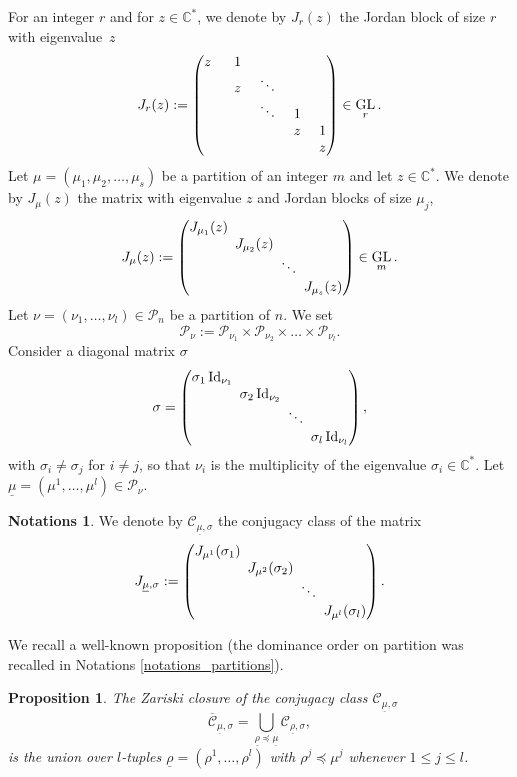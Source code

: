 \documentclass[JEP,XML,SOM,NoEqCountersInSection,Unicode,published]{cedram}
\theoremstyle{definition}
\newtheorem{notations}[definition]{Notations}
\theoremstyle{plain}
\newtheorem{proposition}[definition]{Proposition}
\DeclareMathOperator{\Id}{Id}
\DeclareMathOperator{\GL}{GL}
\newcommand{\C}{\mathbb{C}}
\newcommand{\Part}{\mathcal{P}}
\begin{document}
For an integer $r$ and for $ z \in \C^*$, we denote by $J_r (z)$ the Jordan block of size $r$ with eigenvalue~$z$
\[\arraycolsep6.5pt
J_{r}(z):= \begin{pmatrix}
z \ & 1 & & & \\
& z & \ddots & &\\
& & \ddots & 1 & \\
& & & z & 1 \\
& & & & z
\end{pmatrix} \in \GL_{r}.
\]
Let $\mu=(\mu_1,\mu_2,\dots,\mu_s)$ be a partition of an integer $m$ and let $z \in \C^*$. We denote by $J_{\mu} (z)$ the matrix with eigenvalue $z$ and Jordan blocks of size $\mu_j$,
\[\arraycolsep2.5pt
J_{\mu} (z) :=
\begin{pmatrix}
J_{\mu_1}(z) & & &\\
& J_{\mu_2}(z) & & \\
& & \ddots & \\
& & & J_{\mu_s}(z)
\end{pmatrix} \in \GL_{m}.
\]
Let $\nu=(\nu_1,\dots,\nu_l) \in \Part_n$ be a partition of $n$. We set
\[
\Part_{\nu} := \Part_{\nu_1}\times\Part_{\nu_2} \times\dots\times \Part_{\nu_l}.
\]
Consider a diagonal matrix $\sigma$
\begin{equation}\label{eq_def_sigma}
\arraycolsep2.5pt
\sigma = \begin{pmatrix}
\sigma_1 \Id_{\nu_1} & & & \\
& \sigma_2 \Id_{\nu_2} & & \\
& & \ddots & \\
& & & \sigma_l \Id_{\nu_l}
\end{pmatrix},
\end{equation}
with $\sigma_i \ne \sigma_j$ for $i\ne j$, so that $\nu_i$ is the multiplicity of the eigenvalue $\sigma_i\in \C^*$. Let $\underline{\mu}= \left(\mu^{1},\dots,\mu^{l}\right)\in \Part_{\nu}$.
\begin{notations}\label{notations_jmus}
We denote by $\mathcal{C}_{\underline{\mu},\sigma}$ the conjugacy class of the matrix
\[\arraycolsep2.5pt
J_{\underline{\mu},\sigma}:=\begin{pmatrix}
J_{\mu^{1}}(\sigma_1) & & & \\
& J_{\mu^{2}}(\sigma_2) & & \\
& & \ddots & \\
& & & J_{\mu^{l}}(\sigma_l)
\end{pmatrix}.
\]
\end{notations}
We recall a well-known proposition (the dominance order on partition was recalled in Notations \ref{notations_partitions}).
\begin{proposition}
The Zariski closure of the conjugacy class $\mathcal{C}_{\underline{\mu},\sigma}$
\[
\overline{\mathcal{C}}_{\underline{\mu},\sigma} = \bigcup_{\underline{\rho}\preceq\underline{\mu}} \mathcal{C}_{\underline{\rho},\sigma},
\]
is the union over $l$-tuples $\underline{\rho}=\left(\rho^{1},\dots,\rho^{l}\right)$ with
$
\rho^{j}\preceq \mu^{j}$ whenever $1\le j \le l
$.
\end{proposition}
\end{document}
